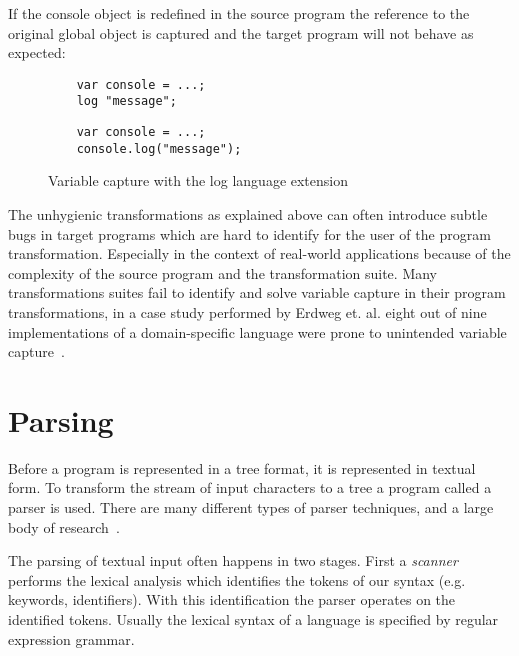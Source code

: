 If the console object is redefined in the source program the reference to the original global object is captured and the target program will not behave as expected:

\begin{figure}[!h]
\begin{minipage}{0.45\textwidth}
	\begin{lstlisting}
	var console = ...;	
	log "message";
	\end{lstlisting}
\end{minipage}
\hfill
\begin{minipage}{0.45\textwidth}
	\begin{lstlisting}
	var console = ...;	
	console.log("message");
	\end{lstlisting}
\end{minipage}
\caption{Variable capture with the log language extension}
\end{figure}

The unhygienic transformations as explained above can often introduce subtle bugs in target programs which are hard to identify for the user of the program transformation. Especially in the context of real-world applications because of the complexity of the source program and the transformation suite. Many transformations suites fail to identify and solve variable capture in their program transformations, in a case study performed by Erdweg et. al. eight out of nine implementations of a domain-specific language were prone to unintended variable capture~\cite{Erdweg2014a}.

\section{Parsing} \label{parsing}
Before a program is represented in a tree format, it is represented in textual form. To transform the stream of input characters to a tree a program called a parser is used. There are many different types of parser techniques, and a large body of research~\cite{Visser1997,VandenBrand2002,Salomon1989}.

The parsing of textual input often happens in two stages. First a \textit{scanner} performs the lexical analysis which identifies the tokens of our syntax (e.g. keywords, identifiers). With this identification the parser operates on the identified tokens. Usually the lexical syntax of a language is specified by regular expression grammar.

